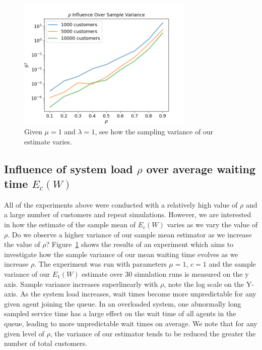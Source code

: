 \documentclass{article}
\begin{document}
    \begin{figure}[!ht]
        \centering
        \includegraphics[width=0.75\textwidth]{pictures/part_2/samp_var_q2.png}
        \caption{Given $\mu = 1$ and $\lambda = 1$, see how the sampling variance of our estimate varies.  }
        \label{fig:samp_var}
    \end{figure}

    \subsection*{Influence of system load $\rho$ over average waiting time $E_c(W)$}

    All of the experiments above were conducted with a relatively high value of $\rho$ and a large number of customers and repeat simulations. However, we are interested in how the estimate of the sample mean of $E_c(W)$ varies as we vary the value of $\rho$. Do we observe a higher variance of our sample mean estimator as we increase the value of $\rho$? Figure~\ref{fig:samp_var} shows the results of an experiment which aims to investigate how the sample variance of our mean waiting time evolves as we increase $\rho$. The experiment was run with parameters $\mu = 1$, $c = 1$ and the sample variance of our $E_1(W)$ estimate over 30 simulation runs is measured on the y axis. Sample variance increases superlinearly with $\rho$, note the log scale on the Y-axis. As the system load increases, wait times become more unpredictable for any given agent joining the queue. In an overloaded system, one abnormally long sampled service time has a large effect on the wait time of all agents in the queue, leading to more unpredictable wait times on average. We note that for any given level of $\rho$, the variance of our estimator tends to be reduced the greater the number of total customers.\\
\end{document}
